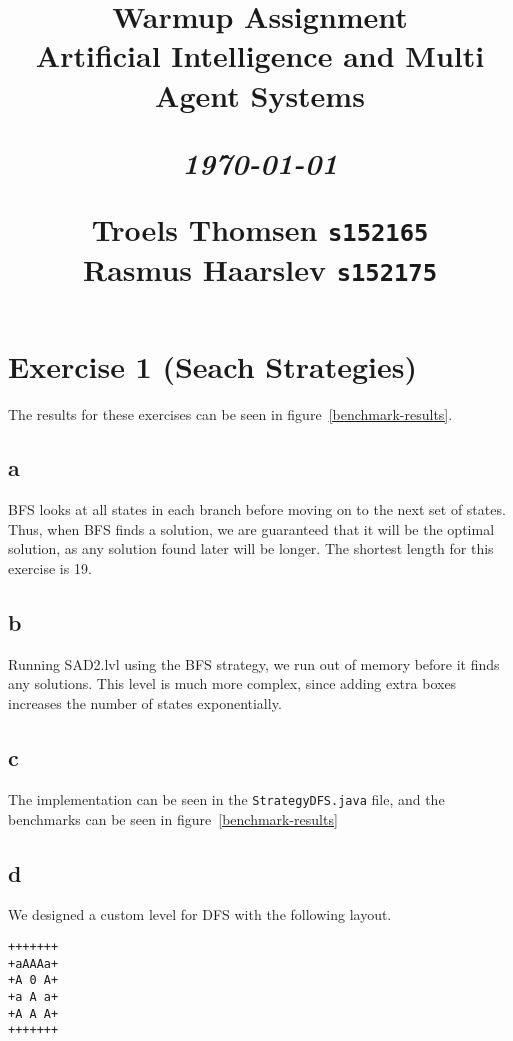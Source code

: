 \documentclass[12pt]{article}
\title{
  \vspace{4cm}
  \begin{flushleft}
  \Large{\textbf{Warmup Assignment}} \\
  \large{Artificial Intelligence and Multi Agent Systems}
  \end{flushleft}
  \vspace{0cm}
  \begin{flushleft}
  \small
  \textit{\today}
  \end{flushleft}
  \vspace{12cm}
  \begin{flushleft}
  \small
  Troels Thomsen \texttt{s152165} \\
  Rasmus Haarslev \texttt{s152175} \\
  \end{flushleft}
}
\date{
}
\begin{document}
\clearpage
{}
\thispagestyle{empty}
\maketitle

\newpage

\section{Exercise 1 (Seach Strategies)}

The results for these exercises can be seen in figure~\ref{benchmark-results}.


\subsection{a}
\label{sub:a}

BFS looks at all states in each branch before moving on to the next set of states. Thus, when BFS finds a solution, we are guaranteed that it will be the optimal solution, as any solution found later will be longer. The shortest length for this exercise is 19.

\subsection{b}
\label{sub:b}

Running SAD2.lvl using the BFS strategy, we run out of memory before it finds any solutions.
This level is much more complex, since adding extra boxes increases the number of states exponentially.


\subsection{c}
\label{sub:c}

The implementation can be seen in the \texttt{StrategyDFS.java} file, and the benchmarks can be seen in figure~\ref{benchmark-results}


\subsection{d}
\label{sub:d}

We designed a custom level for DFS with the following layout.

\begin{verbatim}
+++++++
+aAAAa+
+A 0 A+
+a A a+
+A A A+
+++++++
\end{verbatim}
\end{document}
